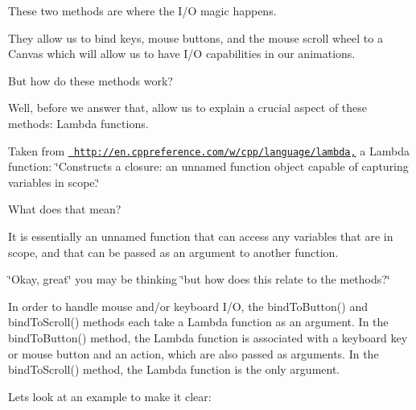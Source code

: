 These two methods are where the I/O magic happens.

They allow us to bind keys, mouse buttons, and the mouse scroll wheel to a Canvas which will allow us to have I/O capabilities in our animations.

But how do these methods work?

Well, before we answer that, allow us to explain a crucial aspect of these methods\+: Lambda functions.

Taken from \href{http://en.cppreference.com/w/cpp/language/lambda,}{\texttt{ http\+://en.\+cppreference.\+com/w/cpp/language/lambda,}} a Lambda function\+: \char`\"{}\+Constructs a closure\+: an unnamed function object capable of capturing variables in scope.\char`\"{}

What does that mean?

It is essentially an unnamed function that can access any variables that are in scope, and that can be passed as an argument to another function.

\char`\"{}\+Okay, great\char`\"{} you may be thinking \char`\"{}but how does this relate to the methods?\char`\"{}

In order to handle mouse and/or keyboard I/O, the {\ttfamily bind\+To\+Button()} and {\ttfamily bind\+To\+Scroll()} methods each take a Lambda function as an argument. In the {\ttfamily bind\+To\+Button()} method, the Lambda function is associated with a keyboard key or mouse button and an action, which are also passed as arguments. In the {\ttfamily bind\+To\+Scroll()} method, the Lambda function is the only argument.

Let\textquotesingle{}s look at an example to make it clear\+:


